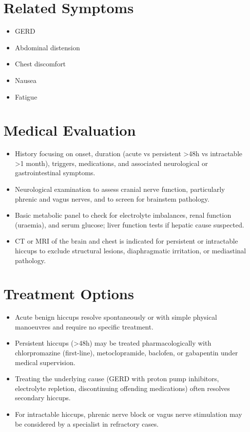 \section*{Related Symptoms}
\begin{itemize}
  \item GERD
  \item Abdominal distension
  \item Chest discomfort
  \item Nausea
  \item Fatigue
\end{itemize}

\section*{Medical Evaluation}
\begin{itemize}
  \item History focusing on onset, duration (acute vs persistent >48h vs intractable >1 month), triggers, medications, and associated neurological or gastrointestinal symptoms.
  \item Neurological examination to assess cranial nerve function, particularly phrenic and vagus nerves, and to screen for brainstem pathology.
  \item Basic metabolic panel to check for electrolyte imbalances, renal function (uraemia), and serum glucose; liver function tests if hepatic cause suspected.
  \item CT or MRI of the brain and chest is indicated for persistent or intractable hiccups to exclude structural lesions, diaphragmatic irritation, or mediastinal pathology.
\end{itemize}

\section*{Treatment Options}
\begin{itemize}
  \item Acute benign hiccups resolve spontaneously or with simple physical manoeuvres and require no specific treatment.
  \item Persistent hiccups (>48h) may be treated pharmacologically with chlorpromazine (first-line), metoclopramide, baclofen, or gabapentin under medical supervision.
  \item Treating the underlying cause (GERD with proton pump inhibitors, electrolyte repletion, discontinuing offending medications) often resolves secondary hiccups.
  \item For intractable hiccups, phrenic nerve block or vagus nerve stimulation may be considered by a specialist in refractory cases.
\end{itemize}


